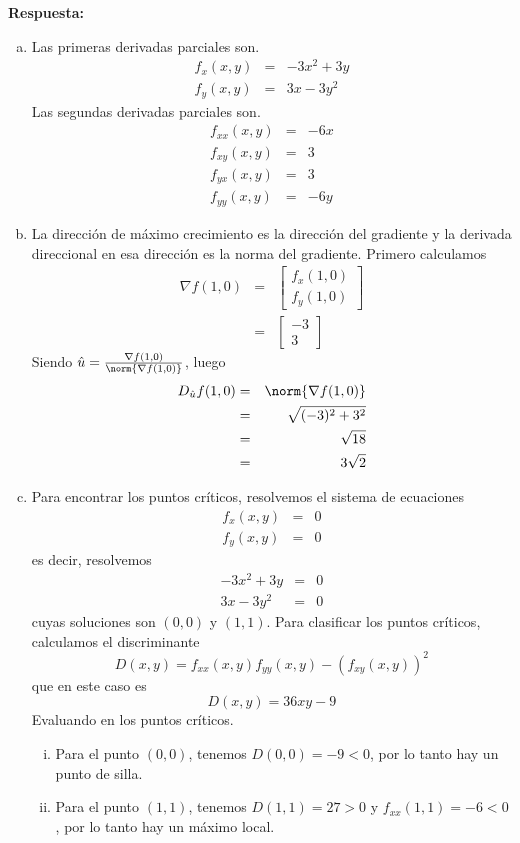 \documentclass{article}
\begin{document}
\vspace{2mm}
\noindent\textbf{Respuesta:} 
\begin{enumerate}[a)]
  \item Las primeras derivadas parciales son.
    \begin{eqnarray*}
      f_x(x,y) &=& -3x^2+3y\\
      f_y(x,y) &=& 3x-3y^2
    \end{eqnarray*}
    Las segundas derivadas parciales son.
      \begin{eqnarray*}
        f_{xx}(x,y) &=& -6x\\
        f_{xy}(x,y) &=& 3\\
        f_{yx}(x,y) &=& 3\\
        f_{yy}(x,y) &=& -6y
      \end{eqnarray*}
  \item La dirección de máximo crecimiento es la dirección del gradiente y la derivada direccional en esa dirección es la norma del gradiente. Primero calculamos
    \begin{eqnarray*}
      \nabla f(1,0) 
        &=& \begin{bmatrix} f_x(1,0) \\ f_y(1,0) \end{bmatrix}\\
        &=& \begin{bmatrix} -3\\ 3 \end{bmatrix}
    \end{eqnarray*}
  Siendo $\hat{u} = \frac{\nabla f(1,0)}{\norm{\nabla f(1,0)}}$, luego
    \begin{eqnarray*}
      D_{\hat{u}}f(1,0) 
        &=& \norm{\nabla f(1,0)}\\
        &=& \sqrt{(-3)^2+3^2}\\
        &=& \sqrt{18}\\
        &=& 3\sqrt{2}
    \end{eqnarray*}
  \item Para encontrar los puntos críticos, resolvemos el sistema de ecuaciones
    $$\begin{array}{rcl}
      f_x(x,y) & = & 0\\
      f_y(x,y) & = & 0
    \end{array}$$
    es decir, resolvemos
    $$\begin{array}{rcl}
      -3x^2+3y & = & 0\\
      3x-3y^2 & = & 0
    \end{array}$$
    cuyas soluciones son $(0,0)$ y $(1,1)$. Para clasificar los puntos críticos, calculamos el discriminante
      $$D(x,y) = f_{xx}(x,y)f_{yy}(x,y)-(f_{xy}(x,y))^2$$
    que en este caso es
      $$D(x,y) = 36xy-9$$
    Evaluando en los puntos críticos.
    \begin{enumerate}[i)]
      \item Para el punto $(0,0)$, tenemos $D(0,0) = -9 < 0$, por lo tanto hay un punto de silla.
      \item Para el punto $(1,1)$, tenemos $D(1,1) = 27 > 0$ y $f_{xx}(1,1) = -6 < 0$, por lo tanto hay un máximo local.
    \end{enumerate}
\end{enumerate}
\end{document}

